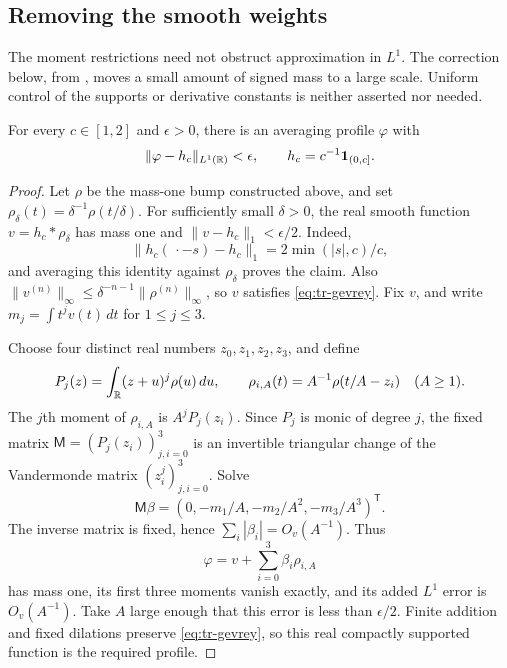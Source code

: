 \subsection{Removing the smooth weights}

The moment restrictions need not obstruct approximation in \(L^1\).
The correction below, from \cite[Lemma~2.8]{V}, moves a small amount
of signed mass to a large scale.  Uniform control of the supports or
derivative constants is neither asserted nor needed.

\begin{lemma}
\label{lem:tr-density}
For every \(c\in[1,2]\) and \(\epsilon>0\), there is an averaging
profile \(\varphi\) with
\[
 \|\varphi-h_c\|_{L^1(\mathbb R)}<\epsilon,
 \qquad h_c=c^{-1}\mathbf1_{(0,c]}.
\]
\end{lemma}

\begin{proof}
Let \(\rho\) be the mass-one bump constructed above, and set
\(\rho_\delta(t)=\delta^{-1}\rho(t/\delta)\).  For sufficiently
small \(\delta>0\), the real smooth function
\(v=h_c*\rho_\delta\) has mass one and
\(\|v-h_c\|_1<\epsilon/2\).  Indeed,
\[
 \|h_c(\,\cdot-s)-h_c\|_1=2\min(|s|,c)/c,
\]
and averaging this identity against \(\rho_\delta\) proves the
claim.  Also
\(\|v^{(n)}\|_\infty\leq\delta^{-n-1}\|\rho^{(n)}\|_\infty\),
so \(v\) satisfies \eqref{eq:tr-gevrey}.  Fix \(v\), and write
\(m_j=\int t^jv(t)\,dt\) for \(1\leq j\leq3\).

Choose four distinct real numbers \(z_0,z_1,z_2,z_3\), and define
\[
 P_j(z)=\int_\mathbb R(z+u)^j\rho(u)\,du,
 \qquad \rho_{i,A}(t)=A^{-1}\rho(t/A-z_i)
 \quad(A\geq1).
\]
The \(j\)th moment of \(\rho_{i,A}\) is \(A^jP_j(z_i)\).
Since \(P_j\) is monic of degree \(j\), the fixed matrix
\(\mathsf M=(P_j(z_i))_{j,i=0}^3\) is an invertible triangular
change of the Vandermonde matrix \((z_i^j)_{j,i=0}^3\).  Solve
\[
 \mathsf M\beta=(0,-m_1/A,-m_2/A^2,-m_3/A^3)^{\mathsf T}.
\]
The inverse matrix is fixed, hence \(\sum_i|\beta_i|=O_v(A^{-1})\).
Thus
\[
 \varphi=v+\sum_{i=0}^3\beta_i\rho_{i,A}
\]
has mass one, its first three moments vanish exactly, and its added
\(L^1\) error is \(O_v(A^{-1})\).  Take \(A\) large enough that
this error is less than \(\epsilon/2\).  Finite addition and fixed
dilations preserve \eqref{eq:tr-gevrey}, so this real compactly
supported function is the required profile.
\end{proof}

